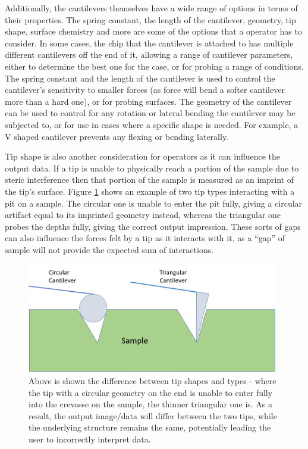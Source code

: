 Additionally, the cantilevers themselves have a wide range of options in terms of their properties. The spring constant, the length of the cantilever, geometry, tip shape, surface chemistry and more are some of the options that a operator has to consider. In some cases, the chip that the cantilever is attached to has multiple different cantilevers off the end of it, allowing a range of cantilever parameters, either to determine the best one for the case, or for probing a range of conditions. The spring constant and the length of the cantilever is used to control the cantilever's sensitivity to smaller forces (as force will bend a softer cantilever more than a hard one), or for probing surfaces. The geometry of the cantilever can be used to control for any rotation or lateral bending the cantilever may be subjected to, or for use in cases where a specific shape is needed. For example, a V shaped cantilever prevents any flexing or bending laterally.

Tip shape is also another consideration for operators as it can influence the output data. If a tip is unable to physically reach a portion of the sample due to steric interference then that portion of the sample is measured as an imprint of the tip's surface. Figure \ref{fig:tipshape} shows an example of two tip types interacting with a pit on a sample. The circular one is unable to enter the pit fully, giving a circular artifact equal to its imprinted geometry instead, whereas the triangular one probes the depths fully, giving the correct output impression. These sorts of gaps can also influence the forces felt by a tip as it interacts with it, as a ``gap'' of sample will not provide the expected sum of interactions.

\begin{figure}[h!]     %
        \begin{center}
          \includegraphics[width=110mm]{chapter2/Tip Shapes.PNG}
\end{center}
\caption{Above is shown the difference between tip shapes and types - where the tip with a circular geometry on the end is unable to enter fully into the crevasse on the sample, the thinner triangular one is. As a result, the output image/data will differ between the two tips, while the underlying structure remains the same, potentially leading the user to incorrectly interpret data.}
\label{fig:tipshape}                 %
\end{figure}

